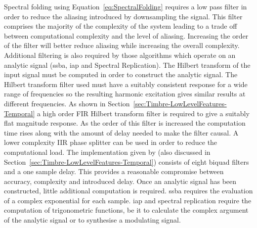 		Spectral folding using Equation~\ref{eq:SpectralFolding} requires a low pass filter in order to reduce the
		aliasing introduced by downsampling the signal. This filter comprises the majority of the complexity of the
		system leading to a trade off between computational complexity and the level of aliasing. Increasing the
		order of the filter will better reduce aliasing while increasing the overall complexity. Additional
		filtering is also required by those algorithms which operate on an analytic signal (\acrshort{ssba},
		\acrshort{iap} and Spectral Replication). The Hilbert transform of the input signal must be computed in
		order to construct the analytic signal. The Hilbert transform filter used must have a suitably consistent
		response for a wide range of frequencies so the resulting harmonic excitation gives similar results at
		different frequencies.  As shown in Section~\ref{sec:Timbre-LowLevelFeatures-Temporal} a high order FIR
		Hilbert transform filter is required to give a suitably flat magnitude response. As the order of this
		filter is increased the computation time rises along with the amount of delay needed to make the filter
		causal. A lower complexity IIR phase splitter can be used in order to reduce the computational load. The
		implementation given by \citet{niemitalo2003hilbert} (also discussed in
		Section~\ref{sec:Timbre-LowLevelFeatures-Temporal}) consists of eight biquad filters and a one sample
		delay. This provides a reasonable compromise between accuracy, complexity and introduced delay.  Once an
		analytic signal has been constructed, little additional computation is required. \acrshort{ssba} requires
		the evaluation of a complex exponential for each sample. \acrshort{iap} and spectral replication require
		the computation of trigonometric functions, be it to calculate the complex argument of the analytic signal
		or to synthesise a modulating signal.

